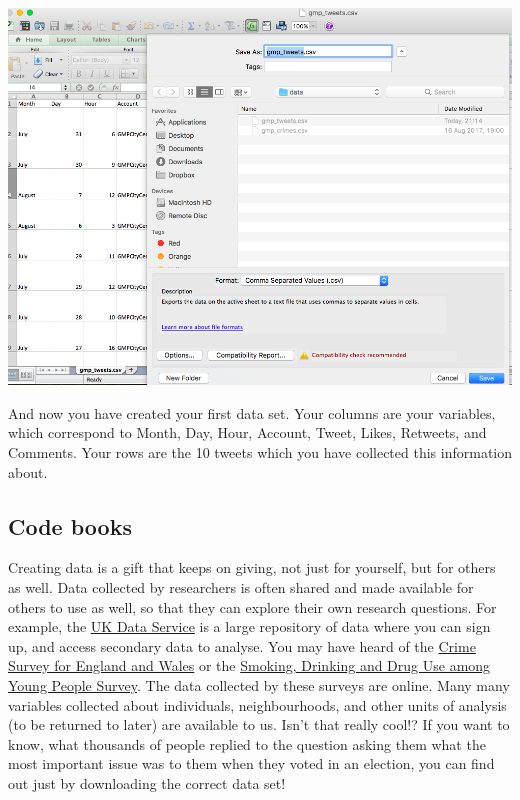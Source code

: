 \documentclass[]{book}
\theoremstyle{definition}
\theoremstyle{definition}
\theoremstyle{definition}
\theoremstyle{remark}
\begin{document}
\includegraphics{imgs/save_tweets.png}

And now you have created your first data set. Your columns are your
variables, which correspond to Month, Day, Hour, Account, Tweet, Likes,
Retweets, and Comments. Your rows are the 10 tweets which you have
collected this information about.

\hypertarget{code-books}{%
\subsection{Code books}\label{code-books}}

Creating data is a gift that keeps on giving, not just for yourself, but
for others as well. Data collected by researchers is often shared and
made available for others to use as well, so that they can explore their
own research questions. For example, the
\href{https://www.ukdataservice.ac.uk/}{UK Data Service} is a large
repository of data where you can sign up, and access secondary data to
analyse. You may have heard of the
\href{http://www.crimesurvey.co.uk/}{Crime Survey for England and Wales}
or the \href{http://content.digital.nhs.uk/catalogue/PUB17879}{Smoking,
Drinking and Drug Use among Young People Survey}. The data collected by
these surveys are online. Many many variables collected about
individuals, neighbourhoods, and other units of analysis (to be returned
to later) are available to us. Isn't that really cool!? If you want to
know, what thousands of people replied to the question asking them what
the most important issue was to them when they voted in an election, you
can find out just by downloading the correct data set!
\end{document}
